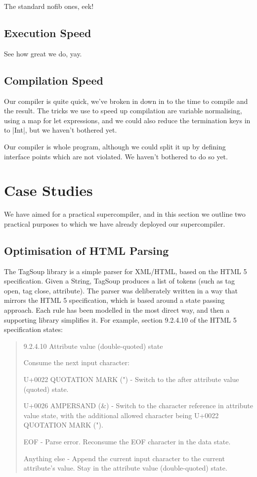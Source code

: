 \documentclass{sigplanconf}
\begin{document}
The standard nofib ones, eek!

\subsection{Execution Speed}

See how great we do, yay.

\subsection{Compilation Speed}

Our compiler is quite quick, we've broken in down in to the time to compile and the result. The tricks we use to speed up compilation are variable normalising, using a map for let expressions, and we could also reduce the termination keys in to |Int|, but we haven't bothered yet.

Our compiler is whole program, although we could split it up by defining interface points which are not violated. We haven't bothered to do so yet.

\section{Case Studies}

We have aimed for a practical supercompiler, and in this section we outline two practical purposes to which we have already deployed our supercompiler.

\subsection{Optimisation of HTML Parsing}
\label{sec:tagsoup}

The TagSoup library \cite{tagsoup} is a simple parser for XML/HTML, based on the HTML 5 specification. Given a String, TagSoup produces a list of tokens (such as tag open, tag close, attribute). The parser was deliberately written in a way that mirrors the HTML 5 specification, which is based around a state passing approach. Each rule has been modelled in the most direct way, and then a supporting library simplifies it. For example, section 9.2.4.10 of the HTML 5 specification states:

\begin{quote}
9.2.4.10 Attribute value (double-quoted) state

Consume the next input character:

U+0022 QUOTATION MARK (") - Switch to the after attribute value (quoted) state.

U+0026 AMPERSAND (\&) - Switch to the character reference in attribute value state, with the additional allowed character being U+0022 QUOTATION MARK (").

EOF - Parse error. Reconsume the EOF character in the data state.

Anything else - Append the current input character to the current attribute's value. Stay in the attribute value (double-quoted) state.
\end{quote}
\end{document}
